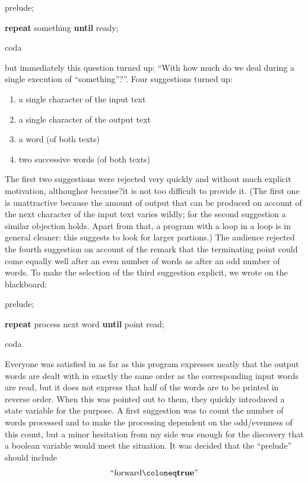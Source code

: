 \documentclass[twoside,11pt]{book}
\begin{document}
\quad prelude;

\quad \textbf{repeat} something \textbf{until} ready;

\quad coda

\noindent
but immediately this question turned up: ``With how much do we deal during a single execution of ``something''?''. Four suggestions turned up:

\begin{enumerate}[wide, nosep, label=(\arabic*)]
	\item a single character of the input text
	\item a single character of the output text
	\item a word (of both texts)
	\item two successive words (of both texts)
\end{enumerate}

The first two suggestions were rejected very quickly and without much explicit motivation, although\textemdash{}or because?\textemdash{}it is not too difficult to provide it. (The first one is unattractive because the amount of output that can be produced on account of the next character of the input text varies wildly; for the second suggestion a similar objection holds. Apart from that, a program with a loop in a loop is in general cleaner: this suggests to look for larger portions.) The audience rejected the fourth suggestion on account of the remark that the terminating point could come equally well after an even number of words as after an odd number of words. To make the selection of the third suggestion explicit, we wrote on the blackboard:

\quad prelude;

\quad \textbf{repeat} process next word \textbf{until} point read;

\quad coda

Everyone was satisfied in as far as this program expresses neatly that the output words are dealt with in exactly the same order as the corresponding input words are read, but it does not express that half of the words are to be printed in reverse order. When this was pointed out to them, they quickly introduced a state variable for the purpose. A first suggestion was to count the number of words processed and to make the processing dependent on the odd/evenness of this count, but a minor hesitation from my side was enough for the discovery that a boolean variable would meet the situation. It was decided that the ``prelude'' should include
$$
\text{``forward} \coloneq \text{\textbf{true}''}
$$
\end{document}
